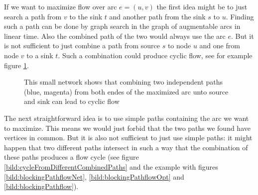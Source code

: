 If we want to maximize flow over arc $e=(u,v)$ the first idea might be to just search a path from $v$ to the sink $t$ 
and another path from the sink $s$ to $u$. Finding such a path can be done by graph search in the graph of augmentable 
arcs in linear time. Also the combined path of the two would always use the arc $e$.
But it is not sufficient to just combine a path from source $s$ to node 
$u$ and one from node $v$ to a sink $t$. Such a combination could produce cyclic flow, see for example figure 
\ref{bild:cycleFromCombinedPaths}. \\

\begin{figure}[h!]
\centering
{}
\caption{This small network shows that combining two independent paths (blue, magenta) from both endes of the maximized 
arc unto source and sink can lead to cyclic flow}
 \label{bild:cycleFromCombinedPaths}
\end{figure}

The next straightforward idea is to use simple paths containing the arc we want to maximize. This means we would just 
forbid that the two paths we found have vertices in common. 
But it is also not sufficient to just use simple paths: it might happen that two different paths intersect in 
such a way that the combination of these paths produces a flow cycle (see figure 
\ref{bild:cycleFromDifferentCombinedPaths} and the example with figures \ref{bild:blockingPathflowNet}, 
\ref{bild:blockingPathflowOpt} and \ref{bild:blockingPathflow}).

